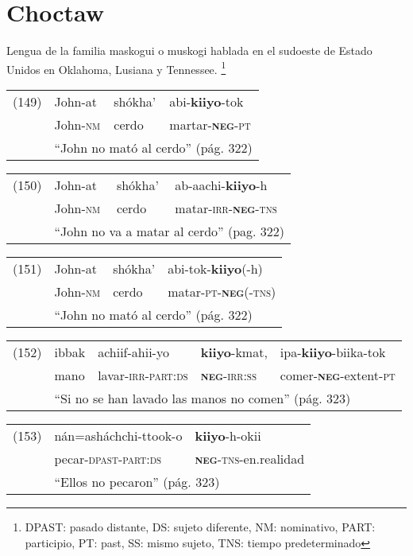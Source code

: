 \section*{Choctaw}

\noindent Lengua de la familia maskogui o muskogi hablada en el sudoeste de Estado Unidos en Oklahoma, Lusiana y Tennessee.
\footnote{DPAST: pasado distante, DS: sujeto diferente, NM: nominativo, PART: participio, PT: past, SS: mismo sujeto, TNS: tiempo predeterminado}
\vspace{0.5cm}

{\setmainfont{Charis SIL} 

\begin{tabular}{llll}
(149) & John-at & shókha' & abi-\textbf{kiiyo}-tok \\
& John-\textsc{nm} & cerdo & martar-\textsc{\textbf{neg}-pt} \\
& \multicolumn{3}{l}{``John no mató al cerdo'' (pág. 322)}
\end{tabular} \vspace{0.5cm}

\begin{tabular}{llll}
(150) & John-at & shókha' & ab-aachi-\textbf{kiiyo}-h \\
& John-\textsc{nm} & cerdo & matar-\textsc{irr-\textbf{neg}-tns} \\
& \multicolumn{3}{l}{``John no va a matar al cerdo'' (pag. 322)}
\end{tabular} \vspace{0.5cm}

\begin{tabular}{llll}
(151) & John-at & shókha' & abi-tok-\textbf{kiiyo}(-h) \\
& John-\textsc{nm} & cerdo & matar-\textsc{pt-\textbf{neg}(-tns)} \\
& \multicolumn{3}{l}{``John no mató al cerdo'' (pág. 322)}
\end{tabular} \vspace{0.5cm}

\begin{tabular}{lllll}
(152) & ibbak & achiif-ahii-yo & \textbf{kiiyo}-kmat, & ipa-\textbf{kiiyo}-biika-tok \\
& mano & lavar-\textsc{irr-part:ds} & \textsc{\textbf{neg}-irr:ss} & comer-\textsc{\textbf{neg}-}extent-\textsc{pt} \\
& \multicolumn{4}{l}{``Si no se han lavado las manos no comen'' (pág. 323)}
\end{tabular} \vspace{0.5cm}

\begin{tabular}{lll}
(153) & nán=asháchchi-ttook-o & \textbf{kiiyo}-h-okii \\
& pecar-\textsc{dpast-part:ds} & \textsc{\textbf{neg}-tns-}en.realidad \\
& \multicolumn{2}{l}{``Ellos no pecaron'' (pág. 323)}
\end{tabular} \vspace{0.5cm}

}

